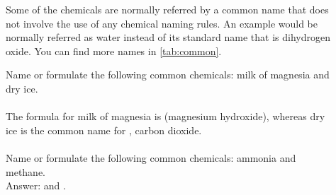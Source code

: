 \documentclass[main.tex]{subfiles}
\begin{document}
\begin{description}
\item[] 
Some of the chemicals are normally referred by a common name that does not involve the use of any chemical naming rules. An example would be  normally referred as water instead of its standard name that is dihydrogen oxide. You can find more names in \ref{tab:common}. 

\begin{example} %
Name or formulate the following common chemicals: milk of magnesia and dry ice. \\
\\
The formula for milk of magnesia is  (magnesium hydroxide), whereas dry ice is the common name for , carbon dioxide.\\
\faDiamond\ \\
Name or formulate the following common chemicals: ammonia and methane.\\
\flushright Answer:  and .
\end{example}%
\end{description}



\clearpage\thispagestyle{empty}\mbox{}\clearpage
\end{document}
